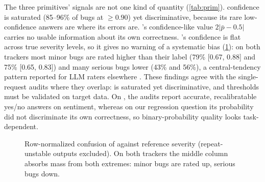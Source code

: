 The three primitives' signals are not one kind of quantity
(\cref{tab:prim}). \choice{} confidence is saturated (85--96\% of bugs at
$\geq 0.90$) yet discriminative, because its rare low-confidence answers
are where its errors are. \noul{}'s confidence-like value $2|\bar p - 0.5|$
carries no usable information about its own correctness. \score{}'s
confidence is flat across true severity levels, so it gives no warning of
a systematic bias (\cref{fig:sev}): on both trackers most minor bugs are rated higher than
their label (79\% [0.67, 0.88] and 75\% [0.65, 0.83]) and many serious bugs lower (43\% and 56\%), a
central-tendency pattern reported for LLM raters elsewhere
\citep{zhang2026centraltendency}. These findings agree with the
single-request audits where they overlap: \choice{} is saturated yet
discriminative, and thresholds must be validated on target data. On
\noul{}, the audits report accurate, recalibratable yes/no answers on
sentiment, whereas on our regression question its probability did not
discriminate its own correctness, so binary-probability quality looks
task-dependent.

\begin{figure}[t]
\centering
{}
\caption{Row-normalized confusion of \score{} against reference severity
(repeat-unstable outputs excluded). On both trackers the middle column
absorbs mass from both extremes: minor bugs are rated up, serious bugs
down.}
\label{fig:sev}
\end{figure}

